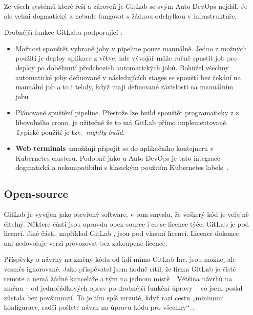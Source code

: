         Ze všech systémů které řeší \CI a zároveň \CD je GitLab se svým Auto DevOps nejdál. Je ale velmi dogmatický a nebude fungovat s žádnou odchylkou v infrastruktuře.

        Drobnější funkce GitLabu podporující \CD:
        \begin{itemize}
            \item Možnost spouštět vybrané joby v pipeline pouze manuálně. Jedno z možných použití je deploy aplikace z  větve, kde vývojář může ručně spustit job pro deploy po doběhnutí předchozích automatických jobů. Bohužel všechny automatické joby definované v následujících stages se spouští bez čekání na manuální job a to i tehdy, když mají definované závislosti na manuálním jobu~\cite{gitlab-issue-manual-job}.
            \item Plánované spuštění pipeline. Přestože lze build spouštět programaticky z  z libovolného cronu, je užitečné že to má GitLab přímo implementované. Typické použití je tzv.~\textit{nightly build}.
            \item \textbf{Web terminals} umožňují připojit se do aplikačního kontejneru v Kubernetes clusteru. Podobně jako u Auto DevOps je tato integrace dogmatická a nekompatibilní s klasickým použitím Kubernetes labels~\cite{gitlab-issue-k8s-deploy}.
        \end{itemize}

    \subsection{Open-source}
        GitLab je vyvíjen jako otevřený software, v tom smyslu, že veškerý kód je veřejně čitelný. Některé části jsou opravdu open-source i co se licence týče: GitLab  je pod  licencí. Jiné části, například GitLab , jsou pod vlastní licencí. Licence dokonce ani nedovoluje  verzi provozovat bez zakoupené licence.

        Příspěvky a návrhy na změny kódu od lidí mimo GitLab Inc. jsou možne, ale vesměs ignorované. Jako přispěvatel jsem hodně cítil, že firma GitLab je čistě remote a nemá žádné kanceláře a tým na jednom místě~\cite{gitlab-team}. Většina návrhů na změnu -- od jednořádkových oprav po drobnější funkční úpravy -- co jsem poslal zůstala bez povšimnutí. To je tím spíš mrzuté, když razí cestu „minimum konfigurace, radši pošlete návrh na úpravu kódu pro všechny“~\cite{gitlab-no-custom}.


